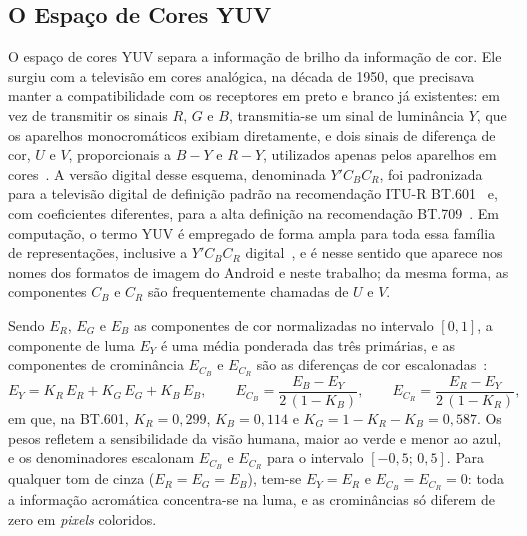 \subsection{O Espaço de Cores YUV} \label{sec:yuv}

O espaço de cores YUV separa a informação de brilho da informação de cor. Ele surgiu com a televisão em cores analógica, na década de 1950, que precisava manter a compatibilidade com os receptores em preto e branco já existentes: em vez de transmitir os sinais $R$, $G$ e $B$, transmitia-se um sinal de luminância $Y$, que os aparelhos monocromáticos exibiam diretamente, e dois sinais de diferença de cor, $U$ e $V$, proporcionais a $B - Y$ e $R - Y$, utilizados apenas pelos aparelhos em cores~\cite{poynton2012digital}. A versão digital desse esquema, denominada $Y'C_BC_R$, foi padronizada para a televisão digital de definição padrão na recomendação ITU-R BT.601~\cite{itu_bt601} e, com coeficientes diferentes, para a alta definição na recomendação BT.709~\cite{poynton2012digital}. Em computação, o termo YUV é empregado de forma ampla para toda essa família de representações, inclusive a $Y'C_BC_R$ digital~\cite{poynton2012digital}, e é nesse sentido que aparece nos nomes dos formatos de imagem do Android e neste trabalho; da mesma forma, as componentes $C_B$ e $C_R$ são frequentemente chamadas de $U$ e $V$.

Sendo $E_R$, $E_G$ e $E_B$ as componentes de cor normalizadas no intervalo $[0, 1]$, a componente de luma $E_Y$ é uma média ponderada das três primárias, e as componentes de crominância $E_{C_B}$ e $E_{C_R}$ são as diferenças de cor escalonadas~\cite{itu_bt601,poynton2012digital}:
\begin{equation}
    E_Y = K_R\,E_R + K_G\,E_G + K_B\,E_B, \qquad
    E_{C_B} = \frac{E_B - E_Y}{2\,(1 - K_B)}, \qquad
    E_{C_R} = \frac{E_R - E_Y}{2\,(1 - K_R)},
    \label{eq:rgb_yuv}
\end{equation}
em que, na BT.601, $K_R = 0{,}299$, $K_B = 0{,}114$ e $K_G = 1 - K_R - K_B = 0{,}587$. Os pesos refletem a sensibilidade da visão humana, maior ao verde e menor ao azul, e os denominadores escalonam $E_{C_B}$ e $E_{C_R}$ para o intervalo $[-0{,}5;\, 0{,}5]$. Para qualquer tom de cinza ($E_R = E_G = E_B$), tem-se $E_Y = E_R$ e $E_{C_B} = E_{C_R} = 0$: toda a informação acromática concentra-se na luma, e as crominâncias só diferem de zero em \textit{pixels} coloridos.

